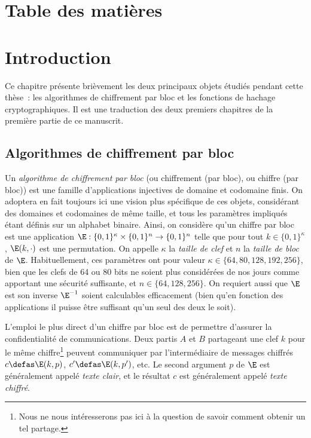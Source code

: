 

\cleardoublepage
\chapter*{Table des matières}
\parttoc


\chapter[Introduction]{Introduction}

Ce chapitre présente brièvement les deux principaux objets étudiés pendant cette thèse~: les algorithmes
de chiffrement par bloc et les fonctions de hachage cryptographiques. Il est une traduction
des deux premiers chapitres de la première partie de ce manuscrit.

\medskip

\begin{center}
\aldineleft
\end{center}

\medskip


\section{Algorithmes de chiffrement par bloc}

Un \emph{algorithme de chiffrement par bloc} (ou chiffrement (par bloc), ou chiffre (par bloc)) est une famille d'applications
injectives de domaine et codomaine finis. On adoptera en fait toujours ici une vision plus spécifique de ces objets,
considérant des domaines et codomaines de même taille, et tous les paramètres impliqués étant définis sur un alphabet
binaire. Ainsi, on considère qu'un chiffre par bloc est une application
$\E : \{0,1\}^\kappa \times \{0,1\}^n \rightarrow \{0,1\}^n$
telle que pour tout $k \in \{0,1\}^\kappa$, $\E(k,\cdot)$ est une permutation.
On appelle
$\kappa$ la \emph{taille de clef} et $n$ la \emph{taille de bloc} de $\E$. Habituellement, ces paramètres ont pour valeur
$\kappa \in \{64, 80, 128, 192, 256\}$, bien que les clefs de 64 ou 80 bits ne soient plus considérées de nos jours
comme apportant une sécurité suffisante, et 
$n \in \{64, 128, 256\}$.
On requiert aussi que $\E$ est son inverse $\E^{-1}$ soient calculables efficacement (bien qu'en fonction des applications
il puisse être suffisant qu'un seul des deux le soit). 

L'emploi le plus direct d'un chiffre par bloc est de permettre d'assurer la confidentialité de communications.
Deux partis $A$ et $B$ partageant une clef $k$ pour le même chiffre\footnote{Nous ne nous intéresserons pas ici à la question de savoir
comment obtenir un tel partage.} peuvent communiquer par l'intermédiaire de messages chiffrés $c \defas \E(k,p)$,
$c' \defas \E(k,p')$, etc. Le second argument $p$ de $\E$ est généralement appelé 
\emph{texte clair}, et le résultat $c$ est généralement appelé \emph{texte chiffré}.

